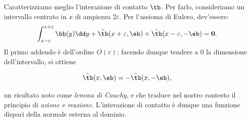 Caratterizziamo meglio l'interazione di contatto $\tb$. Per farlo, consideriamo un intervallo centrato in $x$ di ampiezza $2\varepsilon$. Per l'assioma di Eulero, dev'essere:
\begin{equation}
\int_{x-\varepsilon}^{x+\varepsilon}\bb(y)\dd y+\hat{\tb}(x+\varepsilon,\eb)+\hat{\tb}(x-\varepsilon,-\eb)= \mathbf{0}.
\end{equation}
Il primo addendo è dell'ordine $O(\varepsilon)$; facendo dunque tendere a 0 la dimensione dell'intervallo, si ottiene
\begin{definition}
	\begin{equation}\label{lemmaC1}
	\hat{\tb}(x,\eb)=-\hat{\tb}(x,-\eb),
\end{equation}
\end{definition}
un risultato noto come \textit{lemma di Cauchy},  e che traduce nel nostro contesto il principio di \textit{azione e reazione}. L'interazione di contatto è dunque una funzione dispari della normale esterna al dominio.

